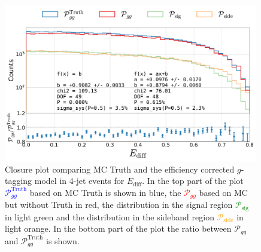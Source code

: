 \FloatBarrier
\newpage

\begin{figure}
  \centerfloat
  \includegraphics[width=0.99\textwidth, trim=10 0 20 5, clip, page=1]{figures/quarks/gtag-closure_test-down_sample=1.00-ML_vars=vertex-selection=b-ejet_min=4-n_iter_RS_lgb=99-n_iter_RS_xgb=9-cdot_cut=0.90-version=19-njet=4.pdf}
  \caption[Closure Plot Comparing MC Truth and the Efficiency Corrected $g$-Tagging Model in 4-Jet Events for $E_\mathrm{diff}$]
          {Closure plot comparing MC Truth and the efficiency corrected $g$-tagging model in 4-jet events for $E_\mathrm{diff}$. In the top part of the plot \textcolor{blue}{$\mathcal{P}_{gg}^\mathrm{Truth}$} based on MC Truth is shown in blue, the \textcolor{red}{$\mathcal{P}_{gg}$} based on MC but without Truth in red, the distribution in the signal region \textcolor{green}{$\mathcal{P}_{\mathrm{sig}}$} in light green and the distribution in the sideband region \textcolor{orange}{$\mathcal{P}_{\mathrm{side}}$} in light orange. In the bottom part of the plot the ratio between $\mathcal{P}_{gg}$ and $\mathcal{P}_{gg}^\mathrm{Truth}$  is shown. } 
  \label{fig:q:closure_E_diff}
\end{figure}
